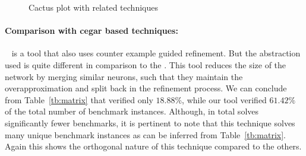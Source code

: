




\begin{figure}[t]
  
  \caption{Cactus plot with related techniques}
  \label{res:milp_with_milp}
\end{figure}

\paragraph{Comparison with cegar based techniques: }
\cegarnn{}~\cite{elboher2020abstraction} is a tool that also uses  counter example guided refinement. But the abstraction used is quite different in comparison to the  \deeppoly{}. This tool reduces the size of the network by merging similar neurons, such that they maintain the overapproximation and split back in the refinement process. We can conclude from Table~\ref{tb:matrix} that \cegarnn{} verified only  $18.88\%$, while our tool verified $61.42\%$ of the total number of benchmark instances. Although, in total \cegarnn{} solves significantly fewer benchmarks, it is pertinent to note that this technique solves many unique benchmark instances as can be inferred from Table~\ref{tb:matrix}. Again this shows the orthogonal nature of this technique compared to the others.%


